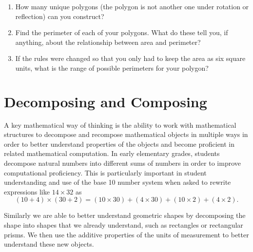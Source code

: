 \documentclass[
]{book}
\providecommand{\tightlist}{%
  \setlength{\itemsep}{0pt}\setlength{\parskip}{0pt}}
\let\stdsection\section
\renewcommand\section{\newpage\stdsection}
\theoremstyle{definition}
\theoremstyle{definition}
\theoremstyle{definition}
\theoremstyle{definition}
\theoremstyle{remark}
\begin{document}
\begin{enumerate}
  \begin{enumerate}
  \def\labelenumii{\alph{enumii}.}
  \tightlist
  \item
    How many unique polygons (the polygon is not another one under rotation or reflection) can you construct?
  \item
    Find the perimeter of each of your polygons. What do these tell you, if anything, about the relationship between area and perimeter?
  \item
    If the rules were changed so that you only had to keep the area as six square units, what is the range of possible perimeters for your polygon?
  \end{enumerate}
\end{enumerate}

\hypertarget{decomposing-and-composing}{%
\section{Decomposing and Composing}\label{decomposing-and-composing}}

A key mathematical way of thinking is the ability to work with mathematical structures to decompose and recompose mathematical objects in multiple ways in order to better understand properties of the objects and become proficient in related mathematical computation. In early elementary grades, students decompose natural numbers into different sums of numbers in order to improve computational proficiency. This is particularly important in student understanding and use of the base 10 number system when asked to rewrite expressions like \(14 \times 32\) as \[(10+4)\times (30 +2) = (10 \times 30)+(4\times 30)+(10\times 2)+(4 \times 2).\]

Similarly we are able to better understand geometric shapes by decomposing the shape into shapes that we already understand, such as rectangles or rectangular prisms. We then use the additive properties of the units of measurement to better understand these new objects.
\end{document}
